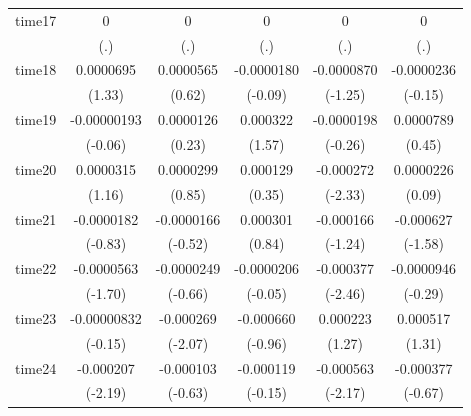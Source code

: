 \begin{table}[htbp]
\begin{tabular}{l*{5}{c}}
time17      &           0         &           0         &           0         &           0         &           0         \\
            &         (.)         &         (.)         &         (.)         &         (.)         &         (.)         \\
time18      &   0.0000695         &   0.0000565         &  -0.0000180         &  -0.0000870         &  -0.0000236         \\
            &      (1.33)         &      (0.62)         &     (-0.09)         &     (-1.25)         &     (-0.15)         \\
time19      & -0.00000193         &   0.0000126         &    0.000322         &  -0.0000198         &   0.0000789         \\
            &     (-0.06)         &      (0.23)         &      (1.57)         &     (-0.26)         &      (0.45)         \\
time20      &   0.0000315         &   0.0000299         &    0.000129         &   -0.000272\sym{*}  &   0.0000226         \\
            &      (1.16)         &      (0.85)         &      (0.35)         &     (-2.33)         &      (0.09)         \\
time21      &  -0.0000182         &  -0.0000166         &    0.000301         &   -0.000166         &   -0.000627         \\
            &     (-0.83)         &     (-0.52)         &      (0.84)         &     (-1.24)         &     (-1.58)         \\
time22      &  -0.0000563         &  -0.0000249         &  -0.0000206         &   -0.000377\sym{*}  &  -0.0000946         \\
            &     (-1.70)         &     (-0.66)         &     (-0.05)         &     (-2.46)         &     (-0.29)         \\
time23      & -0.00000832         &   -0.000269\sym{*}  &   -0.000660         &    0.000223         &    0.000517         \\
            &     (-0.15)         &     (-2.07)         &     (-0.96)         &      (1.27)         &      (1.31)         \\
time24      &   -0.000207\sym{*}  &   -0.000103         &   -0.000119         &   -0.000563\sym{*}  &   -0.000377         \\
            &     (-2.19)         &     (-0.63)         &     (-0.15)         &     (-2.17)         &     (-0.67)         \\

\end{tabular}
\end{table}
